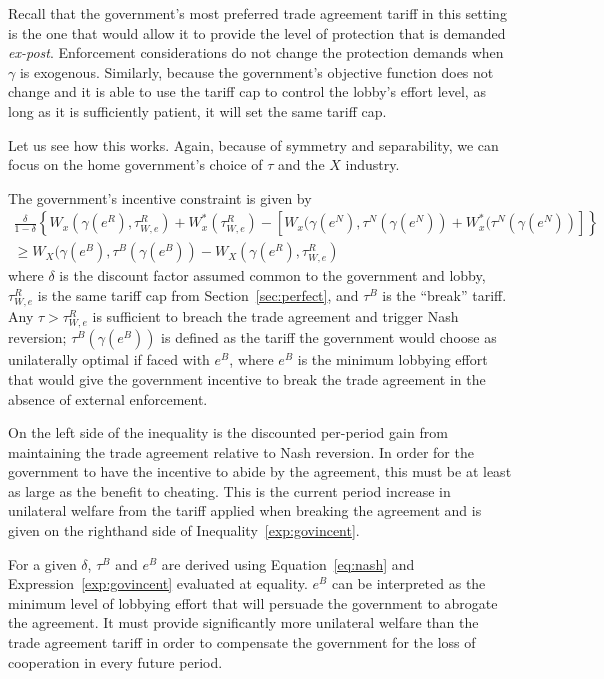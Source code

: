 \documentclass[12pt]{article}
\newcommand{\ga}{\gamma}
\newcommand{\de}{\delta}
\begin{document}
Recall that the government's most preferred trade agreement tariff in this setting is the one that would allow it to provide the level of protection that is demanded \textit{ex-post}. Enforcement considerations do not change the protection demands when $\ga$ is exogenous. Similarly, because the government's objective function does not change and it is able to use the tariff cap to control the lobby's effort level, as long as it is sufficiently patient, it will set the same tariff cap.

Let us see how this works. Again, because of symmetry and separability, we can focus on the home government's choice of $\tau$ and the $X$ industry.

The government's incentive constraint is given by
  \begin{multline}
    \frac{\de}{1-\de} \left\{W_x(\ga(e^R),\tau^R_{W,e}) + W_x^*(\tau^R_{W,e}) - \left[W_x(\ga(e^N),\tau^N(\ga(e^N)) + W_x^*(\tau^N(\ga(e^N)) \right] \right\} \\ \geq W_X(\ga(e^B),\tau^B(\ga(e^B)) - W_X(\ga(e^R),\tau^R_{W,e})
		\label{exp:govincent}
  \end{multline}
where $\de$ is the discount factor assumed common to the government and lobby, $\tau^R_{W,e}$ is the same tariff cap from Section~\ref{sec:perfect}, and $\tau^B$ is the ``break'' tariff. Any $\tau > \tau^R_{W,e}$ is sufficient to breach the trade agreement and trigger Nash reversion; $\tau^B(\ga(e^B))$ is defined as the tariff the government would choose as unilaterally optimal if faced with $e^B$, where $e^B$ is the minimum lobbying effort that would give the government incentive to break the trade agreement in the absence of external enforcement.

On the left side of the inequality is the discounted per-period gain from maintaining the trade agreement relative to Nash reversion. In order for the government to have the incentive to abide by the agreement, this must be at least as large as the benefit to cheating. This is the current period increase in unilateral welfare from the tariff applied when breaking the agreement and is given on the righthand side of Inequality~\ref{exp:govincent}.

For a given $\de$, $\tau^B$ and $e^B$ are derived using Equation~\ref{eq:nash} and Expression~\ref{exp:govincent} evaluated at equality. $e^B$ can be interpreted as the minimum level of lobbying effort that will persuade the government to abrogate the agreement. It must provide significantly more unilateral welfare than the trade agreement tariff in order to compensate the government for the loss of cooperation in every future period.
\end{document}
